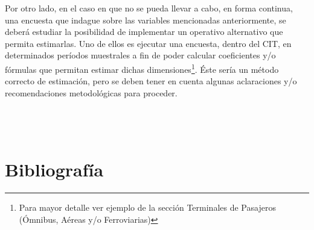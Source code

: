 \documentclass[
]{book}
\begin{document}
Por otro lado, en el caso en que no se pueda llevar a cabo, en forma continua, una encuesta que indague sobre las variables mencionadas anteriormente, se deberá estudiar la posibilidad de implementar un operativo alternativo que permita estimarlas. Uno de ellos es ejecutar una encuesta, dentro del CIT, en determinados períodos muestrales a fin de poder calcular coeficientes y/o fórmulas que permitan estimar dichas dimensiones\footnote{Para mayor detalle ver ejemplo de la sección Terminales de Pasajeros (Ómnibus, Aéreas y/o Ferroviarias)}. Éste sería un método correcto de estimación, pero se deben tener en cuenta algunas aclaraciones y/o recomendaciones metodológicas para proceder.\\
~\\
~\\
~\\

\hypertarget{bibliografuxeda}{%
\chapter*{\texorpdfstring{\textbf{Bibliografía}}{Bibliografía}}\label{bibliografuxeda}}

  
\end{document}
